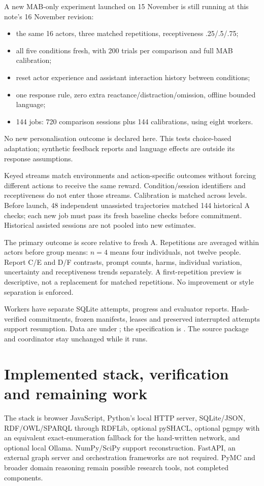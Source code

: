 \documentclass[11pt,a4paper]{article}
\begin{document}
A new MAB-only experiment launched on 15 November is still running at this note's 16 November revision:
\begin{itemize}
\item the same 16 actors, three matched repetitions, receptiveness .25/.5/.75;
\item all five conditions fresh, with 200 trials per comparison and full MAB calibration;
\item reset actor experience and assistant interaction history between conditions;
\item one response rule, zero extra reactance/distraction/omission, offline bounded language;
\item 144 jobs: 720 comparison sessions plus 144 calibrations, using eight workers.
\end{itemize}
No new personalisation outcome is declared here. This tests choice-based adaptation; synthetic feedback reports and language effects are outside its response assumptions.

Keyed streams match environments and action-specific outcomes without forcing different actions to receive the same reward. Condition/session identifiers and receptiveness do not enter those streams. Calibration is matched across levels. Before launch, 48 independent unassisted trajectories matched 144 historical A checks; each new job must pass its fresh baseline checks before commitment. Historical assisted sessions are not pooled into new estimates.

The primary outcome is score relative to fresh A. Repetitions are averaged within actors before group means: $n=4$ means four individuals, not twelve people. Report C/E and D/F contrasts, prompt counts, harms, individual variation, uncertainty and receptiveness trends separately. A first-repetition preview is descriptive, not a replacement for matched repetitions. No improvement or style separation is enforced.

Workers have separate SQLite attempts, progress and evaluator reports. Hash-verified commitments, frozen manifests, leases and preserved interrupted attempts support resumption. Data are under ; the specification is . The source package and coordinator stay unchanged while it runs.

\section{Implemented stack, verification and remaining work}
The stack is browser JavaScript, Python's local HTTP server, SQLite/JSON, RDF/OWL/SPARQL through RDFLib, optional pySHACL, optional pgmpy with an equivalent exact-enumeration fallback for the hand-written network, and optional local Ollama. NumPy/SciPy support reconstruction. FastAPI, an external graph server and orchestration frameworks are not required. PyMC and broader domain reasoning remain possible research tools, not completed components.
\end{document}
